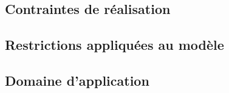 \subsection{Contraintes de réalisation}


\subsection{Restrictions appliquées au modèle}


\subsection{Domaine d'application}
